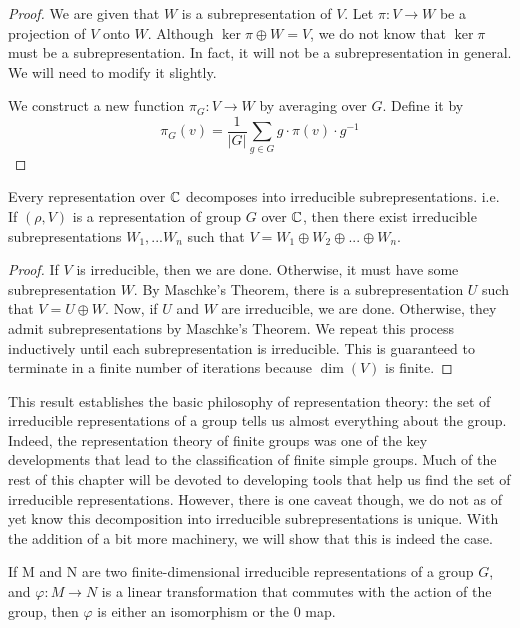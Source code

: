 \begin{proof}
    We are given that $W$ is a subrepresentation of $V$. Let $\pi : V \rightarrow W$ be a projection of $V$ onto 
    $W$. Although $\ker \pi \oplus W = V$, we do not know that $\ker \pi$ must be a subrepresentation. In fact, it 
    will not be a subrepresentation in general. We will need to modify it slightly.

    We construct a new function $\pi_G : V \rightarrow W$ by averaging over $G$. Define it by
    \[
        \pi_G(v) = \frac{1}{|G|}\sum_{g \in G} g \cdot \pi(v) \cdot g^{-1}
    \]
\end{proof}



\begin{theorem}
    Every representation over $\mathbb{C}$ decomposes into irreducible subrepresentations. i.e.
    If $(\rho, V)$ is a representation of group $G$ over $\mathbb{C}$, then there exist irreducible subrepresentations 
    $W_1, ...  W_n$ such that $V = W_1 \oplus W_2 \oplus ... \oplus W_n$.
\end{theorem}

\begin{proof}
    If $V$ is irreducible, then we are done. Otherwise, it must have some subrepresentation $W$. By Maschke's 
    Theorem, there is a subrepresentation $U$ such that $V = U \oplus W$. Now, if $U$ and $W$ are irreducible, we 
    are done. Otherwise, they admit subrepresentations by Maschke's Theorem. We repeat this process inductively 
    until each subrepresentation is irreducible. This is guaranteed to terminate in a finite number of iterations 
    because $\dim(V)$ is finite.
\end{proof}
This result establishes the basic philosophy of representation theory: the set of irreducible representations of a 
group tells us almost everything about the group.  Indeed, the representation theory of finite groups was one of 
the key developments that lead to the classification of finite simple groups.  Much of the rest of this chapter 
will be devoted to developing tools that help us find the set of irreducible representations. However, there is one 
caveat though, we do not as of yet know this decomposition into irreducible subrepresentations is unique. With the 
addition of a bit more machinery, we will show that this is indeed the case.
 
\begin{theorem}
    If M and N are two finite-dimensional irreducible representations of a group $G$, and $\varphi:M \to N$ is a 
    linear transformation that commutes with the action of the group, then $\varphi$ is either an isomorphism or 
    the $0$ map.
\end{theorem}



